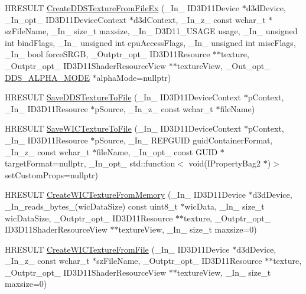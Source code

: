 \begin{DoxyCompactItemize}
\item 
H\+R\+E\+S\+U\+LT \hyperlink{namespace_direct_x_a3fe71d8982208e409bf9ea67dcb11e99}{Create\+D\+D\+S\+Texture\+From\+File\+Ex} (\+\_\+\+In\+\_\+ I\+D3\+D11\+Device $\ast$d3d\+Device, \+\_\+\+In\+\_\+opt\+\_\+ I\+D3\+D11\+Device\+Context $\ast$d3d\+Context, \+\_\+\+In\+\_\+z\+\_\+ const wchar\+\_\+t $\ast$sz\+File\+Name, \+\_\+\+In\+\_\+ size\+\_\+t maxsize, \+\_\+\+In\+\_\+ D3\+D11\+\_\+\+U\+S\+A\+GE usage, \+\_\+\+In\+\_\+ unsigned int bind\+Flags, \+\_\+\+In\+\_\+ unsigned int cpu\+Access\+Flags, \+\_\+\+In\+\_\+ unsigned int misc\+Flags, \+\_\+\+In\+\_\+ bool force\+S\+R\+GB, \+\_\+\+Outptr\+\_\+opt\+\_\+ I\+D3\+D11\+Resource $\ast$$\ast$texture, \+\_\+\+Outptr\+\_\+opt\+\_\+ I\+D3\+D11\+Shader\+Resource\+View $\ast$$\ast$texture\+View, \+\_\+\+Out\+\_\+opt\+\_\+ \hyperlink{namespace_direct_x_a7cb48689d75471680c0bf7f79caaaf1f}{D\+D\+S\+\_\+\+A\+L\+P\+H\+A\+\_\+\+M\+O\+DE} $\ast$alpha\+Mode=nullptr)
\item 
H\+R\+E\+S\+U\+LT \hyperlink{namespace_direct_x_a461ef26b39c87e312275f261b4554b56}{Save\+D\+D\+S\+Texture\+To\+File} (\+\_\+\+In\+\_\+ I\+D3\+D11\+Device\+Context $\ast$p\+Context, \+\_\+\+In\+\_\+ I\+D3\+D11\+Resource $\ast$p\+Source, \+\_\+\+In\+\_\+z\+\_\+ const wchar\+\_\+t $\ast$file\+Name)
\item 
H\+R\+E\+S\+U\+LT \hyperlink{namespace_direct_x_adc9231b7aa4f629edf99f1d4177e6b15}{Save\+W\+I\+C\+Texture\+To\+File} (\+\_\+\+In\+\_\+ I\+D3\+D11\+Device\+Context $\ast$p\+Context, \+\_\+\+In\+\_\+ I\+D3\+D11\+Resource $\ast$p\+Source, \+\_\+\+In\+\_\+ R\+E\+F\+G\+U\+ID guid\+Container\+Format, \+\_\+\+In\+\_\+z\+\_\+ const wchar\+\_\+t $\ast$file\+Name, \+\_\+\+In\+\_\+opt\+\_\+ const G\+U\+ID $\ast$target\+Format=nullptr, \+\_\+\+In\+\_\+opt\+\_\+ std\+::function$<$ void(I\+Property\+Bag2 $\ast$)$>$ set\+Custom\+Props=nullptr)
\item 
H\+R\+E\+S\+U\+LT \hyperlink{namespace_direct_x_a3ce3ec875ba946920f2e8939915fd594}{Create\+W\+I\+C\+Texture\+From\+Memory} (\+\_\+\+In\+\_\+ I\+D3\+D11\+Device $\ast$d3d\+Device, \+\_\+\+In\+\_\+reads\+\_\+bytes\+\_\+(wic\+Data\+Size) const uint8\+\_\+t $\ast$wic\+Data, \+\_\+\+In\+\_\+ size\+\_\+t wic\+Data\+Size, \+\_\+\+Outptr\+\_\+opt\+\_\+ I\+D3\+D11\+Resource $\ast$$\ast$texture, \+\_\+\+Outptr\+\_\+opt\+\_\+ I\+D3\+D11\+Shader\+Resource\+View $\ast$$\ast$texture\+View, \+\_\+\+In\+\_\+ size\+\_\+t maxsize=0)
\item 
H\+R\+E\+S\+U\+LT \hyperlink{namespace_direct_x_a5fdba9031952424bfe7d31e0d859edd2}{Create\+W\+I\+C\+Texture\+From\+File} (\+\_\+\+In\+\_\+ I\+D3\+D11\+Device $\ast$d3d\+Device, \+\_\+\+In\+\_\+z\+\_\+ const wchar\+\_\+t $\ast$sz\+File\+Name, \+\_\+\+Outptr\+\_\+opt\+\_\+ I\+D3\+D11\+Resource $\ast$$\ast$texture, \+\_\+\+Outptr\+\_\+opt\+\_\+ I\+D3\+D11\+Shader\+Resource\+View $\ast$$\ast$texture\+View, \+\_\+\+In\+\_\+ size\+\_\+t maxsize=0)

\end{DoxyCompactItemize}
